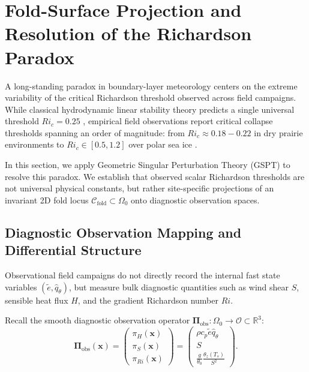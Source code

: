 \section{Fold-Surface Projection and Resolution of the Richardson Paradox}

A long-standing paradox in boundary-layer meteorology centers on the extreme variability of the critical Richardson threshold observed across field campaigns. While classical hydrodynamic linear stability theory predicts a single universal threshold $Ri_c = 0.25$ \citep{Miles1961, Howard1961}, empirical field observations report critical collapse thresholds spanning an order of magnitude: from $Ri_c \approx 0.18 - 0.22$ in dry prairie environments \citep{Poulos2002CASES99} to $Ri_c \in [0.5, 1.2]$ over polar sea ice \citep{Uttal2002SHEBA, Grachev2007, Zilitinkevich2007}.

In this section, we apply Geometric Singular Perturbation Theory (GSPT) to resolve this paradox. We establish that observed scalar Richardson thresholds are not universal physical constants, but rather site-specific projections of an invariant 2D fold locus $\mathcal{C}_{\mathrm{fold}} \subset \Omega_0$ onto diagnostic observation spaces.

\subsection{Diagnostic Observation Mapping and Differential Structure}

Observational field campaigns do not directly record the internal fast state variables $(\tilde e, \hat q_\theta)$, but measure bulk diagnostic quantities such as wind shear $S$, sensible heat flux $H$, and the gradient Richardson number $Ri$.

Recall the smooth diagnostic observation operator $\boldsymbol{\Pi}_{\mathrm{obs}} : \Omega_0 \to \mathcal{O} \subset \mathbb{R}^3$:
\begin{equation}
\boldsymbol{\Pi}_{\mathrm{obs}}(\mathbf{x}) =
\begin{pmatrix}
\pi_H(\mathbf{x}) \\[4pt]
\pi_S(\mathbf{x}) \\[4pt]
\pi_{Ri}(\mathbf{x})
\end{pmatrix}
=
\begin{pmatrix}
\rho c_p \tilde e \hat q_\theta \\[4pt]
S \\[4pt]
\frac{g}{\theta_0} \frac{\theta_z(T_s)}{S^2}
\end{pmatrix}.
\end{equation}


